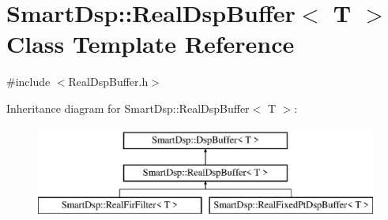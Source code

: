 \hypertarget{class_smart_dsp_1_1_real_dsp_buffer}{\section{Smart\+Dsp\+:\+:Real\+Dsp\+Buffer$<$ T $>$ Class Template Reference}
\label{class_smart_dsp_1_1_real_dsp_buffer}
}


{\ttfamily \#include $<$Real\+Dsp\+Buffer.\+h$>$}

Inheritance diagram for Smart\+Dsp\+:\+:Real\+Dsp\+Buffer$<$ T $>$\+:\begin{figure}[H]
\begin{center}
\leavevmode
\includegraphics[height=3.000000cm]{class_smart_dsp_1_1_real_dsp_buffer}
\end{center}
\end{figure}
